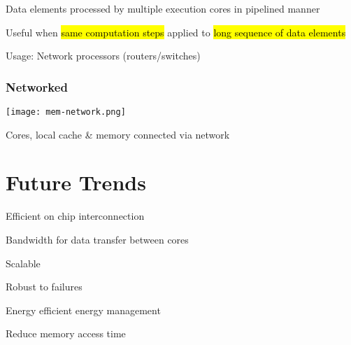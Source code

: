 \documentclass[12pt]{article}
\begin{document}
\begin{spacing}{1.5}
\begin{itemize*}
	\item Data elements processed by multiple execution cores in pipelined manner
	\item Useful when \hl{same computation steps} applied to \hl{long sequence of data elements}
	\item Usage: Network processors (routers/switches)
\end{itemize*}

\subsubsection{Networked}

\begin{center}
\texttt{[image: mem-network.png]}
\end{center}

\begin{itemize*}
	\item Cores, local cache \& memory connected via network
\end{itemize*}

\section{Future Trends}

\begin{itemize*}
	\item Efficient on chip interconnection
		\begin{itemize*}
			\item Bandwidth for data transfer between cores
			\item Scalable
			\item Robust to failures
			\item Energy efficient energy management
			\item Reduce memory access time
		\end{itemize*}
\end{itemize*}

\end{spacing}
\end{document}
